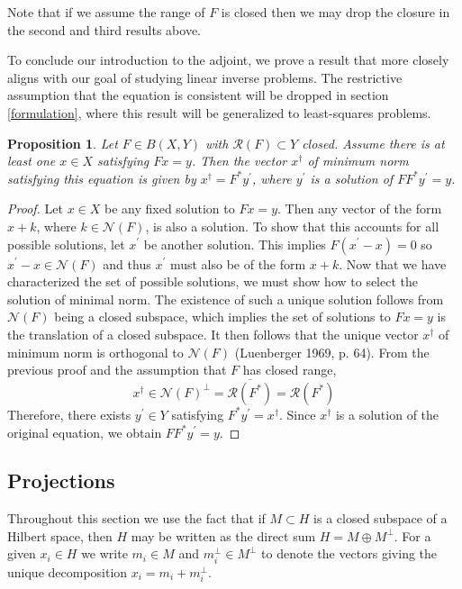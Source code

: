 \documentclass[12pt]{article}
\newtheorem{prop}{Proposition}
\begin{document}
Note that if we assume the range of $F$ is closed then we may drop the closure in the second and third
results above. 

To conclude our introduction to the adjoint, we prove a result that more closely aligns with our goal of studying 
linear inverse problems. The restrictive assumption that the equation is consistent will be dropped in section
\ref{formulation}, where this result will be generalized to least-squares problems. 
\begin{prop} 
Let $F \in B(X, Y)$ with $\mathcal{R}(F) \subset Y$ closed. Assume there is at least one $x \in X$ satisfying
$Fx = y$. Then the vector $x^\dagger$ of minimum norm satisfying this equation is given by 
$x^\dagger = F^*y^\prime$, where $y^\prime$ is a solution of $FF^*y^\prime = y$. 
\end{prop} 

\begin{proof} 
Let $x \in X$ be any fixed solution to $Fx = y$. Then any vector of the form $x + k$, where $k \in \mathcal{N}(F)$, 
is also a solution. To show that this accounts for all possible solutions, let $x^\prime$ be another solution. 
This implies $F(x^\prime - x) = 0$ so $x^\prime - x \in \mathcal{N}(F)$ and thus $x^\prime$ must also be of the form 
$x + k$. Now that we have characterized the set of possible solutions, we must show how to select the solution
of minimal norm. The existence of such a unique solution follows from $\mathcal{N}(F)$ being a closed subspace, 
which implies the set of solutions to $Fx = y$ is the translation of a closed subspace. It then follows that the unique vector $x^\dagger$
of minimum norm is orthogonal to $\mathcal{N}(F)$ (Luenberger 1969, p. 64). From the previous proof and the assumption
that $F$ has closed range, \[x^\dagger \in \mathcal{N}(F)^\perp = \overline{\mathcal{R}(F^*)} = \mathcal{R}(F^*)\]
Therefore, there exists $y^\prime \in Y$ satisfying $F^*y^\prime = x^\dagger$. Since $x^\dagger$ is a solution of 
the original equation, we obtain $FF^*y^\prime = y$. 
\end{proof} 

\subsection{Projections}

Throughout this section we use the fact that if $M \subset H$ is a closed subspace of a Hilbert space, then 
$H$ may be written as the direct sum $H = M \oplus M^\perp$. For a given $x_i \in H$ we write $m_i \in M$ and 
$m_i^\perp \in M^\perp$ to denote the vectors giving the unique decomposition $x_i = m_i + m_i^\perp$. 
\end{document}
